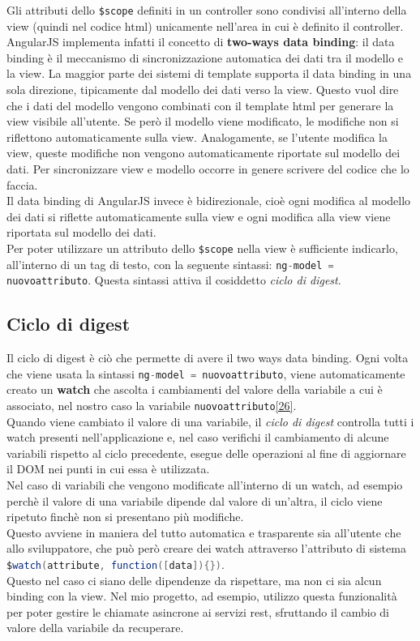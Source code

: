 Gli attributi dello \lstinline[language=HTML]!$scope! definiti in un controller sono condivisi all'interno della view (quindi nel codice \gls{html}) unicamente nell'area in cui è definito il controller. AngularJS implementa infatti il concetto di \textbf{two-ways data binding}: il data binding è il meccanismo di sincronizzazione automatica dei dati tra il modello e la view. La maggior parte dei sistemi di template supporta il data binding in una sola direzione, tipicamente dal modello dei dati verso la view. Questo vuol dire che i dati del modello vengono combinati con il template \gls{html} per generare la view visibile all’utente. Se però il modello viene modificato, le modifiche non si riflettono automaticamente sulla view. Analogamente, se l’utente modifica la view, queste modifiche non vengono automaticamente riportate sul modello dei dati. Per sincronizzare view e modello occorre in genere scrivere del codice che lo faccia.\\
Il data binding di AngularJS invece è bidirezionale, cioè ogni modifica al modello dei dati si riflette automaticamente sulla view e ogni modifica alla view viene riportata sul modello dei dati.\\
Per poter utilizzare un attributo dello \lstinline[language=HTML]!$scope! nella view è sufficiente indicarlo, all'interno di un tag di testo, con la seguente sintassi: \lstinline[language=Java]!ng-model = nuovoattributo!. Questa sintassi attiva il cosiddetto \emph{ciclo di digest}.

\subsection{Ciclo di digest}
Il ciclo di digest è ciò che permette di avere il two ways data binding. Ogni volta che viene usata la sintassi \lstinline[language=Java]!ng-model = nuovoattributo!, viene automaticamente creato un \textbf{watch} che ascolta i cambiamenti del valore della variabile a cui è associato, nel nostro caso la variabile \lstinline[language=Java]!nuovoattributo!\hyperlink{26}{[26]}.\\
Quando viene cambiato il valore di una variabile, il \emph{ciclo di digest} controlla tutti i watch presenti nell'applicazione e, nel caso verifichi il cambiamento di alcune variabili rispetto al ciclo precedente, esegue delle operazioni al fine di aggiornare il DOM nei punti in cui essa è utilizzata.\\
Nel caso di variabili che vengono modificate all'interno di un watch, ad esempio perchè il valore di una variabile dipende dal valore di un'altra, il ciclo viene ripetuto finchè non si presentano più modifiche.\\
Questo avviene in maniera del tutto automatica e trasparente sia all'utente che allo sviluppatore, che può però creare dei watch attraverso l'attributo di sistema \lstinline[language=Java]!$watch(attribute, function([data]){})!.\\ Questo nel caso ci siano delle dipendenze da rispettare, ma non ci sia alcun binding con la view. Nel mio progetto, ad esempio, utilizzo questa funzionalità per poter gestire le chiamate asincrone  ai servizi \gls{rest}, sfruttando il cambio di valore della variabile da recuperare.


